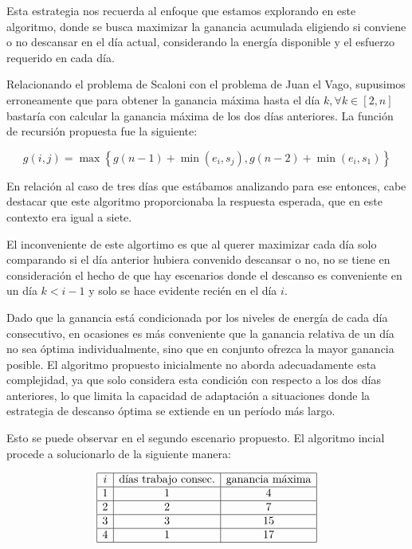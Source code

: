Esta estrategia nos recuerda al enfoque que estamos explorando en este algoritmo, donde se busca maximizar
la ganancia acumulada eligiendo si conviene o no descansar en el día actual, considerando la energía disponible
y el esfuerzo requerido en cada día.

Relacionando el problema de Scaloni con el problema de Juan el Vago, supusimos erroneamente que para obtener la
ganancia máxima hasta el día $k, \forall k \in [2,n]$ bastaría con calcular la ganancia máxima de los dos días anteriores.
La función de recursión propuesta fue la siguiente:  

$$g(i, j) = \max{\left\{g(n-1) + \min{(e_i,s_j)}, g(n-2) + \min{(e_i,s_1)}\right\}}$$

En relación al caso de tres días que estábamos analizando para ese entonces, cabe destacar que este algoritmo proporcionaba la respuesta esperada, 
que en este contexto era igual a siete.

El inconveniente de este algortimo es que al querer maximizar cada día solo comparando si el día anterior hubiera convenido
descansar o no, no se tiene en consideración el hecho de que hay escenarios donde el descanso es conveniente en un día
$k < i-1$ y solo se hace evidente recién en el día $i$. 

Dado que la ganancia está condicionada por los niveles de energía de cada día consecutivo, en ocasiones es más 
conveniente que la ganancia relativa de un día no sea óptima individualmente, sino que en conjunto 
ofrezca la mayor ganancia posible. El algoritmo propuesto inicialmente no aborda adecuadamente esta complejidad, 
ya que solo considera esta condición con respecto a los dos días anteriores, lo que limita la 
capacidad de adaptación a situaciones donde la estrategia de descanso óptima se extiende en un 
período más largo.

Esto se puede observar en el segundo escenario propuesto. El algoritmo incial 
procede a solucionarlo de la siguiente manera:

$$
\begin{array}{|c|c|c|}
    \hline
    i & \text{días trabajo consec.} & \text{ganancia máxima} \\
    \hline
    1 & 1 & 4\\
    \hline
    2 & 2 & 7\\
    \hline
    3 & 3 & 15\\
    \hline
    4 & 1 & 17\\
    \hline
\end{array}
$$



